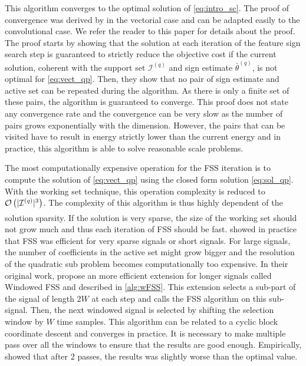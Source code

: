 \documentclass[../thesis.tex]{subfiles}
\begin{document}
	This algorithm converges to the optimal solution of \autoref{eq:intro_sc}.
	The proof of convergence was derived by \cite{Lee2007} in the vectorial case
	and can be adapted easily to the convolutional case. We refer the reader
	to this paper for details about the proof. The proof starts by showing that
	the solution at each iteration of the feature sign search step is guaranteed
	to strictly reduce the objective cost if the current solution, coherent with
	the support set $\mathcal I^{(q)}$ and sign estimate $\bar \theta^{(q)}$, is not
	optimal for \autoref{eq:vect_qp}. Then, they show that no pair of sign estimate
	and active set can be repeated during the algorithm. As there is only a finite
	set of these pairs, the algorithm is guaranteed to converge. This proof does
	not state any convergence rate and the convergence can be very slow as the number
	of pairs grows exponentially with the dimension. However, the pairs that can be
	visited have to result in energy strictly lower than the current energy and in
	practice, this algorithm is able to solve reasonable scale problems.




	The most computationally expensive operation for the FSS iteration is to
	compute the solution of \autoref{eq:vect_qp} using the closed form solution
	\autoref{eq:sol_qp}. With the working set technique, this operation
	complexity is reduced to $\underset{}{\mathcal O}\left(|\mathcal I^{(q)}|^3\right)$. The complexity of
	this algorithm is thus highly dependent of the solution sparsity. If the
	solution is very sparse, the size of the working set should not grow much
	and thus each iteration of FSS should be fast. \citet{Wohlberg2016} showed
	in practice that FSS was efficient for very sparse signals or short signals.
	For large signals, the number of coefficients in the active set might grow
	bigger and the resolution of the quadratic sub problem becomes computationally
	too expensive. In their original work, \citet{Grosse2007} propose an more
	efficient extension for longer signals called Windowed FSS and described in \autoref{alg:wFSS}. This extension
	selects a sub-part of the signal of length $2W$ at each step and calls the FSS
	algorithm on this sub-signal. Then, the next windowed signal is selected by
	shifting the selection window by $W$ time samples. This algorithm can be
	related to a cyclic block coordinate descent and converges in practice. It is
	necessary to make multiple pass over all the windows to ensure that the results
	are good enough. Empirically, \citet{Grosse2007} showed that after 2 passes,
	the results was slightly worse than the optimal value.
\end{document}
